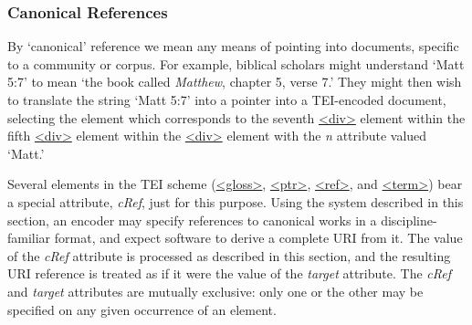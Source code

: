 \subsubsection[{Canonical References}]{Canonical References}\label{SACR}\par
By ‘canonical’ reference we mean any means of pointing into documents, specific to a community or corpus. For example, biblical scholars might understand ‘Matt 5:7’ to mean ‘the book called \textit{Matthew}, chapter 5, verse 7.’ They might then wish to translate the string ‘Matt 5:7’ into a pointer into a TEI-encoded document, selecting the element which corresponds to the seventh \hyperref[TEI.div]{<div>} element within the fifth \hyperref[TEI.div]{<div>} element within the \hyperref[TEI.div]{<div>} element with the {\itshape n} attribute valued ‘Matt.’\par
Several elements in the TEI scheme (\hyperref[TEI.gloss]{<gloss>}, \hyperref[TEI.ptr]{<ptr>}, \hyperref[TEI.ref]{<ref>}, and \hyperref[TEI.term]{<term>}) bear a special attribute, {\itshape cRef}, just for this purpose. Using the system described in this section, an encoder may specify references to canonical works in a discipline-familiar format, and expect software to derive a complete URI from it. The value of the {\itshape cRef} attribute is processed as described in this section, and the resulting URI reference is treated as if it were the value of the {\itshape target} attribute. The {\itshape cRef} and {\itshape target} attributes are mutually exclusive: only one or the other may be specified on any given occurrence of an element.\par
